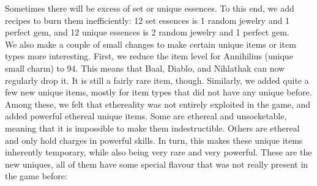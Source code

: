 \documentclass[12pt,a4paper]{article}
\begin{document}
Sometimes there will be excess of set or unique essences. To this end, we add recipes to burn them inefficiently: 12 set essences is 1 random jewelry and 1 perfect gem, and 12 unique essences is 2 random jewelry and 1 perfect gem.\\

We also make a couple of small changes to make certain unique items or item types more interesting. First, we reduce the item level for Annihilius (unique small charm) to 94. This means that Baal, Diablo, and Nihlathak can now regularly drop it. It is still a fairly rare item, though. Similarly, we added quite a few new unique items, mostly for item types that did not have any unique before. Among these, we felt that ethereality was not entirely exploited in the game, and added powerful ethereal unique items. Some are ethereal and unsocketable, meaning that it is impossible to make them indestructible. Others are ethereal and only hold charges in powerful skills. In turn, this makes these unique items inherently temporary, while also being very rare and very powerful. These are the new uniques, all of them have some special flavour that was not really present in the game before:
\end{document}

